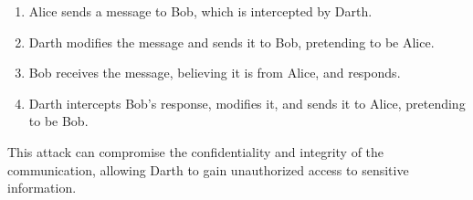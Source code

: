 \documentclass[11pt]{article}
\begin{document}
\begin{enumerate}
\item Alice sends a message to Bob, which is intercepted by Darth.
\item Darth modifies the message and sends it to Bob, pretending to be Alice.
\item Bob receives the message, believing it is from Alice, and responds.
\item Darth intercepts Bob's response, modifies it, and sends it to Alice, pretending to be Bob.
\end{enumerate}

This attack can compromise the confidentiality and integrity of the communication, allowing Darth to gain unauthorized access to sensitive information.
\end{document}
